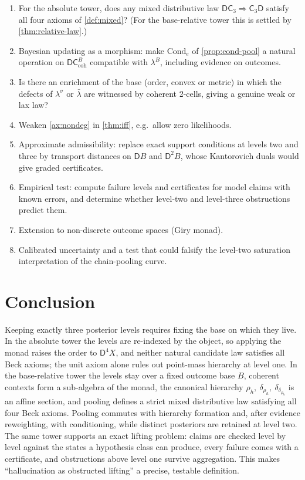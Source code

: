 \documentclass[11pt]{article}
\theoremstyle{definition}
\theoremstyle{remark}
\newcommand{\D}{\mathsf{D}}
\newcommand{\Cond}{\mathrm{Cond}}
\newcommand{\C}{\mathsf{C}}
\newcommand{\lb}{\bar\lambda}
\newcommand{\ls}{\lambda^{\sigma}}
\begin{document}
\begin{enumerate}[leftmargin=*]
\item For the absolute tower, does any mixed distributive law $\D\C_3\Rightarrow\C_3\D$ satisfy
  all four axioms of \cref{def:mixed}? (For the base-relative tower this is settled by
  \cref{thm:relative-law}.)
\item Bayesian updating as a morphism: make $\Cond_e$ of \cref{prop:cond-pool} a natural operation
  on $\D\C^B_{\mathrm{coh}}$ compatible with $\lambda^B$, including evidence on outcomes.
\item Is there an enrichment of the base (order, convex or metric) in which the defects of $\ls$ or
  $\lb$ are witnessed by coherent 2-cells, giving a genuine weak or lax law?
\item Weaken \cref{ax:nondeg} in \cref{thm:iff}, e.g.\ allow zero likelihoods.
\item Approximate admissibility: replace exact support conditions at levels two and three by
  transport distances on $\D B$ and $\D^2B$, whose Kantorovich duals would give graded certificates.
\item Empirical test: compute failure levels and certificates for model claims with known errors, and
  determine whether level-two and level-three obstructions predict them.
\item Extension to non-discrete outcome spaces (Giry monad).
\item Calibrated uncertainty and a test that could falsify the level-two saturation interpretation of
  the chain-pooling curve.
\end{enumerate}

\section{Conclusion}

Keeping exactly three posterior levels requires fixing the base on which they live. In the
absolute tower the levels are re-indexed by the object, so applying the monad raises the order to
$\D^4X$, and neither natural candidate law satisfies all Beck axioms; the unit axiom alone rules out
point-mass hierarchy at level one. In the base-relative tower the levels stay over a fixed outcome
base $B$, coherent contexts form a sub-algebra of the monad, the canonical hierarchy
$\rho_h,\ \delta_{\rho_h},\ \delta_{\delta_{\rho_h}}$ is an affine section, and pooling defines a strict
mixed distributive law satisfying all four Beck axioms. Pooling commutes with hierarchy formation and, after evidence reweighting, with conditioning,
while distinct posteriors are retained at level two. The same tower supports an exact lifting
problem: claims are checked level by level against the states a hypothesis class can produce, every
failure comes with a certificate, and obstructions above level one survive aggregation. This makes
``hallucination as obstructed lifting'' a precise, testable definition.
\end{document}
